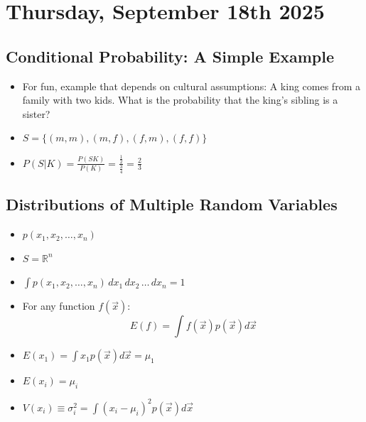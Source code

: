 \section{Thursday, September 18th 2025}

\subsection{Conditional Probability: A Simple Example}
\begin{itemize}
      \item For fun, example that depends on cultural assumptions: A king comes from a family with two kids. What is the probability that the king's sibling is a sister?
      \item $S  = \{ (m,m), (m,f), (f,m), (f,f) \}$
      \item $P(S|K) = \frac{P(SK)}{P(K)} = \frac{\frac{1}{2}}{\frac{3}{4}} = \frac{2}{3}$
\end{itemize}

\subsection{Distributions of Multiple Random Variables}
\begin{itemize}
      \item $p(x_1, x_2, \ldots, x_n) $
      \item $S = \mathbb{R}^n$
      \item $\int p(x_1, x_2, \ldots, x_n) \, dx_1 \, dx_2 \, \ldots \, dx_n = 1$
      \item For any function $f(\vec{x})$:
            \[ E(f) = \int f(\vec{x}) p(\vec{x}) d \vec{x} \]
      \item $E(x_1) = \int x_1 p(\vec{x}) d \vec{x} = \mu_1$
      \item $E(x_i) = \mu_i$
      \item $V(x_i) \equiv \sigma_i^2 = \int (x_i - \mu_i)^2 p(\vec{x}) d \vec{x}$
\end{itemize}

